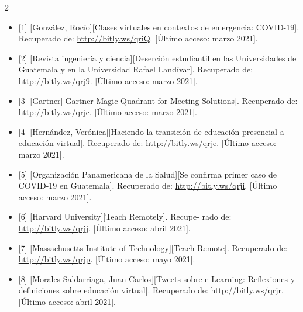 \documentclass[12pt,spanish,Letterpaper,openany]{book}
\begin{document}
\begin {multicols}{2}
\begin{itemize}
\item
  {[}1{]} {[}González, Rocío{]}{[}Clases virtuales en contextos de emergencia: COVID-19{]}. Recuperado de: \url{http://bitly.ws/qriQ}. {[}Último acceso: marzo 2021{]}.
\item
  {[}2{]} {[}Revista ingeniería y ciencia{]}{[}Deserción estudiantil en las Universidades de Guatemala y en la Universidad Rafael Landívar{]}. Recuperado de: \url{http://bitly.ws/qrj9}. {[}Último acceso: marzo 2021{]}.
\item
  {[}3{]} {[}Gartner{]}{[}Gartner Magic Quadrant for Meeting Solutions{]}. Recuperado de: \url{http://bitly.ws/qrjc}. {[}Último acceso: marzo 2021{]}.
\item
  {[}4{]} {[}Hernández, Verónica{]}{[}Haciendo la transición de educación presencial a educación virtual{]}. Recuperado de: \url{http://bitly.ws/qrje}. {[}Último acceso: marzo 2021{]}.
\item
  {[}5{]} {[}Organización Panamericana de la Salud{]}{[}Se confirma primer caso de COVID-19 en Guatemala{]}. Recuperado de: \url{http://bitly.ws/qrji}. {[}Último acceso: marzo 2021{]}.
\item
  {[}6{]} {[}Harvard University{]}{[}Teach Remotely{]}. Recupe-
  rado de: \url{http://bitly.ws/qrjj}. {[}Último acceso: abril 2021{]}.
\item
  {[}7{]} {[}Massachusetts Institute of Technology{]}{[}Teach Remote{]}. Recuperado de: \url{http://bitly.ws/qrjp}. {[}Último acceso: mayo 2021{]}.
\item
  {[}8{]} {[}Morales Saldarriaga, Juan Carlos{]}{[}Tweets sobre e-Learning: Reflexiones y definiciones sobre educación virtual{]}. Recuperado de: \url{http://bitly.ws/qrjr}. {[}Último acceso: abril 2021{]}.
\end{itemize}

\begin {flushleft}
\noindent\begin{minipage}[c]{\columnwidth}
\centering


\end{minipage}
\end{flushleft}
\end{multicols}
\end{document}
